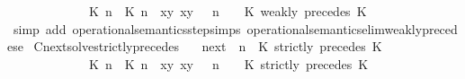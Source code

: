 \begin{isabellebody}
\ \ \ \ \ \ \ \ \ \ {\isasymsupseteq}\ {\isacharbraceleft}\ {\isacharparenleft}{\isacharparenleft}{\isasymlceil}{\isacharhash}\isactrlsup {\isasymle}\ K\ n{\isacharcomma}\ {\isacharhash}\isactrlsup {\isasymle}\ K\ n{\isasymrceil}\ {\isasymin}\ {\isacharparenleft}{\isasymlambda}{\isacharparenleft}x{\isacharcomma}y{\isacharparenright}{\isachardot}\ x{\isasymle}y{\isacharparenright}{\isacharparenright}\ {\isacharhash}\ {\isasymGamma}{\isacharparenright}{\isacharcomma}\ n\ {\isasymturnstile}\ {\isasymPsi}\ {\isasymtriangleright}\ {\isacharparenleft}{\isacharparenleft}K\ weakly\ precedes\ K\ {\isacharhash}\ {\isasymPhi}{\isacharparenright}\ {\isacharbraceright}{\isachardoublequoteclose}\isanewline
%
\isadelimproof
\ \ %
\endisadelimproof
%
\isatagproof
{}\isamarkupfalse%
\ {\isacharparenleft}simp\ add{\isacharcolon}\ operational{\isacharunderscore}semantics{\isacharunderscore}step{\isachardot}simps\ operational{\isacharunderscore}semantics{\isacharunderscore}elim{\isachardot}weakly{\isacharunderscore}precedes{\isacharunderscore}e{\isacharparenright}%
\endisatagproof
{\isafoldproof}%
%
\isadelimproof
\isanewline
%
\endisadelimproof
\isanewline
{}\isamarkupfalse%
\ Cnext{\isacharunderscore}solve{\isacharunderscore}strictly{\isacharunderscore}precedes{\isacharcolon}\isanewline
\ \ \ {\isachardoublequoteopen}{\isacharparenleft}{\isasymC}\isactrlsub n\isactrlsub e\isactrlsub x\isactrlsub t\ {\isacharparenleft}{\isasymGamma}{\isacharcomma}\ n\ {\isasymturnstile}\ {\isacharparenleft}{\isacharparenleft}K\ strictly\ precedes\ K\ {\isacharhash}\ {\isasymPsi}{\isacharparenright}\ {\isasymtriangleright}\ {\isasymPhi}{\isacharparenright}{\isacharparenright}\isanewline
\ \ \ \ \ \ \ \ \ \ {\isasymsupseteq}\ {\isacharbraceleft}\ {\isacharparenleft}{\isacharparenleft}{\isasymlceil}{\isacharhash}\isactrlsup {\isasymle}\ K\ n{\isacharcomma}\ {\isacharhash}\isactrlsup {\isacharless}\ K\ n{\isasymrceil}\ {\isasymin}\ {\isacharparenleft}{\isasymlambda}{\isacharparenleft}x{\isacharcomma}y{\isacharparenright}{\isachardot}\ x{\isasymle}y{\isacharparenright}{\isacharparenright}\ {\isacharhash}\ {\isasymGamma}{\isacharparenright}{\isacharcomma}\ n\ {\isasymturnstile}\ {\isasymPsi}\ {\isasymtriangleright}\ {\isacharparenleft}{\isacharparenleft}K\ strictly\ precedes\ K\ {\isacharhash}\ {\isasymPhi}{\isacharparenright}\ {\isacharbraceright}{\isachardoublequoteclose}\isanewline

\end{isabellebody}
